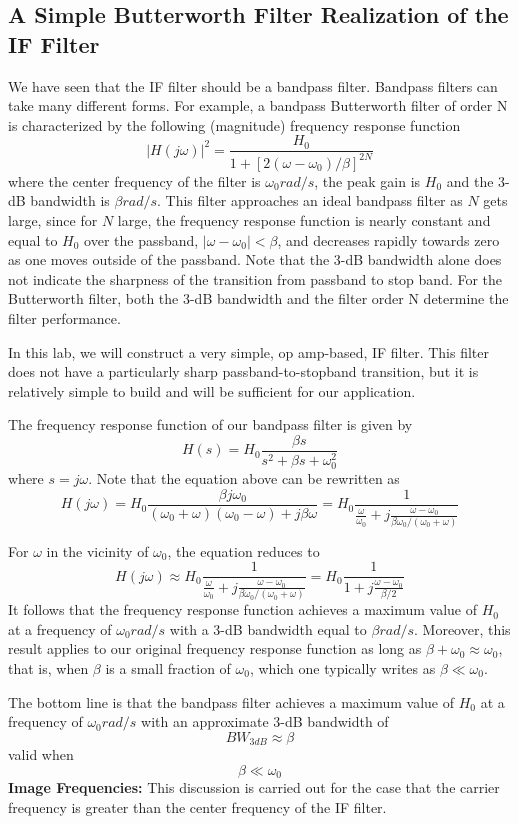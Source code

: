 \documentclass[utf8]{article}
\begin{document}
\subsection{A Simple Butterworth Filter Realization of the IF Filter}
{
	We have seen that the IF filter should be a bandpass filter. Bandpass filters can take many different forms. For example, a bandpass Butterworth filter of order N is characterized by the following (magnitude) frequency response function
	$$|H(j\omega)|^2 = \frac{H_0}{1+[2(\omega-\omega_0)/\beta]^{2N}}$$
	where the center frequency of the filter is $\omega_0 rad/s$, the peak gain is $H_0$ and the 3-dB bandwidth is $\beta rad/s$. This filter approaches an ideal bandpass filter as $N$ gets large, since for $N$ large, the frequency response function is nearly constant and equal to $H_0$ over the passband, $|\omega − \omega_0| < \beta$, and decreases rapidly towards zero as one moves outside of the passband. Note that the 3-dB bandwidth alone does not indicate the sharpness of the transition from passband to stop band. For the Butterworth filter, both the 3-dB bandwidth and the filter order N determine the filter performance.

	In this lab, we will construct a very simple, op amp-based, IF filter. This filter does not have a particularly sharp passband-to-stopband transition, but it is relatively simple to build and will be sufficient for our application.

	The frequency response function of our bandpass filter is given by
	$$H(s) = H_0\frac{\beta s}{s^2+\beta s+\omega_0^2}$$
	where $s = j\omega$. Note that the equation above can be rewritten as
	$$H(j\omega) = H_0\frac{\beta j \omega_0}{(\omega_0+\omega)(\omega_0-\omega)+j\beta\omega} = H_0\frac{1}{\frac{\omega}{\omega_0}+j\frac{\omega-\omega_0}{\beta\omega_0/(\omega_0+\omega)}}$$

	For $\omega$ in the vicinity of $\omega_0$, the equation reduces to
	$$H(j\omega)\approx H_0\frac{1}{\frac{\omega}{\omega_0}+j\frac{\omega-\omega_0}{\beta\omega_0/(\omega_0+\omega)}} = H_0\frac{1}{1+j\frac{\omega-\omega_0}{\beta/2}}$$
	It follows that the frequency response function achieves a maximum value of $H_0$ at a frequency of $\omega_0 rad/s$ with a 3-dB bandwidth equal to $\beta rad/s$. Moreover, this result applies to our original frequency response function as long as $\beta + \omega_0\approx\omega_0$, that is, when $\beta$ is a small fraction of $\omega_0$, which one typically writes as $\beta\ll\omega_0$.

	The bottom line is that the bandpass filter achieves a maximum value of $H_0$ at a frequency of $\omega_0 rad/s$ with an approximate 3-dB bandwidth of
	$$BW_{3dB}\approx\beta$$
	valid when
	$$\beta\ll\omega_0$$
	\textbf{Image Frequencies:}
	This discussion is carried out for the case that the carrier frequency is greater than the center frequency of the IF filter.

}
\end{document}
